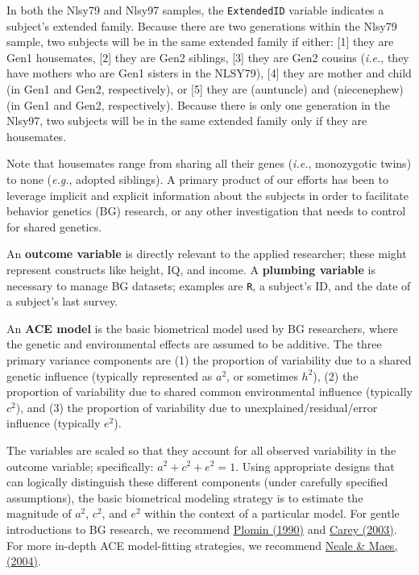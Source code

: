 \documentclass[smallextended]{svjour3}       %
\begin{document}
In both the Nlsy79 and Nlsy97 samples, the \texttt{ExtendedID} variable
indicates a subject's extended family. Because there are two generations
within the Nlsy79 sample, two subjects will be in the same extended
family if either: {[}1{]} they are Gen1 housemates, {[}2{]} they are
Gen2 siblings, {[}3{]} they are Gen2 cousins (\emph{i.e.}, they have
mothers who are Gen1 sisters in the NLSY79), {[}4{]} they are mother and
child (in Gen1 and Gen2, respectively), or {[}5{]} they are
(aunt\textbar uncle) and (niece\textbar nephew) (in Gen1 and Gen2,
respectively). Because there is only one generation in the Nlsy97, two
subjects will be in the same extended family only if they are
housemates.

Note that housemates range from sharing all their genes (\emph{i.e.},
monozygotic twins) to none (\emph{e.g.}, adopted siblings). A primary
product of our efforts has been to leverage implicit and explicit
information about the subjects in order to facilitate behavior genetics
(BG) research, or any other investigation that needs to control for
shared genetics.

An \textbf{outcome variable} is directly relevant to the applied
researcher; these might represent constructs like height, IQ, and
income. A \textbf{plumbing variable} is necessary to manage BG datasets;
examples are \texttt{R}, a subject's ID, and the date of a subject's
last survey.

An \textbf{ACE model} is the basic biometrical model used by BG
researchers, where the genetic and environmental effects are assumed to
be additive. The three primary variance components are (1) the
proportion of variability due to a shared genetic influence (typically
represented as \(a^2\), or sometimes \(h^2\)), (2) the proportion of
variability due to shared common environmental influence (typically
\(c^2\)), and (3) the proportion of variability due to
unexplained/residual/error influence (typically \(e^2\)).

The variables are scaled so that they account for all observed
variability in the outcome variable; specifically:
\(a^2 + c^2 + e^2 = 1\). Using appropriate designs that can logically
distinguish these different components (under carefully specified
assumptions), the basic biometrical modeling strategy is to estimate the
magnitude of \(a^2\), \(c^2\), and \(e^2\) within the context of a
particular model. For gentle introductions to BG research, we recommend
\href{https://books.google.com/books?id=r7AgAQAAIAAJ\&source=gbs_navlinks_s}{Plomin
(1990)} and
\href{https://www.colorado.edu/psych-neuro/gregory-carey}{Carey (2003)}.
For more in-depth ACE model-fitting strategies, we recommend
\href{http://ibgwww.colorado.edu/workshop2006/cdrom/HTML/book2004a.pdf}{Neale
\& Maes, (2004)}.
\end{document}
